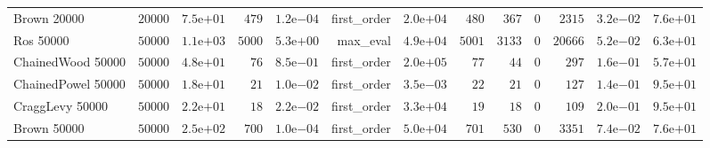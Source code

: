 \begin{longtable}[c]{lrrrrrrrrrrrr}
Brown 20000 & \(20000\) & \( 7.5\)e\(+01\) & \(  479\) & \( 1.2\)e\(-04\) & first\_order & \( 2.0\)e\(+04\) & \(  480\) & \(  367\) & \(    0\) & \( 2315\) & \( 3.2\)e\(-02\) & \( 7.6\)e\(+01\) \\
Ros 50000 & \(50000\) & \( 1.1\)e\(+03\) & \( 5000\) & \( 5.3\)e\(+00\) & max\_eval & \( 4.9\)e\(+04\) & \( 5001\) & \( 3133\) & \(    0\) & \(20666\) & \( 5.2\)e\(-02\) & \( 6.3\)e\(+01\) \\
ChainedWood 50000 & \(50000\) & \( 4.8\)e\(+01\) & \(   76\) & \( 8.5\)e\(-01\) & first\_order & \( 2.0\)e\(+05\) & \(   77\) & \(   44\) & \(    0\) & \(  297\) & \( 1.6\)e\(-01\) & \( 5.7\)e\(+01\) \\
ChainedPowel 50000 & \(50000\) & \( 1.8\)e\(+01\) & \(   21\) & \( 1.0\)e\(-02\) & first\_order & \( 3.5\)e\(-03\) & \(   22\) & \(   21\) & \(    0\) & \(  127\) & \( 1.4\)e\(-01\) & \( 9.5\)e\(+01\) \\
CraggLevy 50000 & \(50000\) & \( 2.2\)e\(+01\) & \(   18\) & \( 2.2\)e\(-02\) & first\_order & \( 3.3\)e\(+04\) & \(   19\) & \(   18\) & \(    0\) & \(  109\) & \( 2.0\)e\(-01\) & \( 9.5\)e\(+01\) \\
Brown 50000 & \(50000\) & \( 2.5\)e\(+02\) & \(  700\) & \( 1.0\)e\(-04\) & first\_order & \( 5.0\)e\(+04\) & \(  701\) & \(  530\) & \(    0\) & \( 3351\) & \( 7.4\)e\(-02\) & \( 7.6\)e\(+01\) \\
\hline 
\end{longtable}



